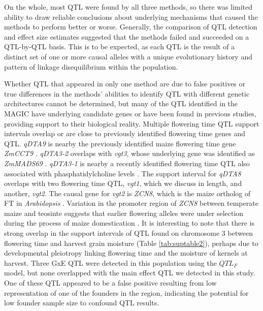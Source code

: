 \documentclass[9pt,twocolumn,twoside]{gsag3jnl}
\begin{document}
On the whole, most QTL were found by all three methods, so there was limited ability to draw reliable conclusions about underlying mechanisms that caused the methods to perform better or worse.
Generally, the comparison of QTL detection and effect size estimates suggested that the methods failed and succeeded on a QTL-by-QTL basis.
This is to be expected, as each QTL is the result of a distinct set of one or more causal alleles with a unique evolutionary history and pattern of linkage disequilibrium within the population.

Whether QTL that appeared in only one method are due to false positives or true differences in the methods' abilities to identify QTL with different genetic architectures cannot be determined, but many of the QTL identified in the MAGIC have underlying candidate genes or have been found in previous studies, providing support to their biological reality.
Multiple flowering time QTL support intervals overlap or are close to previously identified flowering time genes and QTL.
\emph{qDTA9} is nearby the previously identified maize flowering time gene \emph{ZmCCT9} \citep{Huang3}.
\emph{qDTA3-2} overlaps with \emph{vgt3}, whose underlying gene was identified as \emph{ZmMADS69} \citep{Liang}.
\emph{qDTA3-1} is nearby a recently identified flowering time QTL also associated with phasphatidylcholine levels \citep{RodriguezZapata}.
The support interval for \emph{qDTA8} overlaps with two flowering time QTL, \emph{vgt1}, which we discuss in length, and another, \emph{vgt2}.
The causal gene for \emph{vgt2} is \emph{ZCN8}, which is the maize ortholog of FT in \emph{Arabidopsis} \citep{Lazakis}.
Variation in the promoter region of \emph{ZCN8} between temperate maize and teosinte suggests that earlier flowering alleles were under selection during the process of maize domestication \citep{Guo,Bouchet}.
It is interesting to note that there is strong overlap in the support intervals of QTL found on chromosome 3 between flowering time and harvest grain moisture (Table \ref{tab:suptable2}), perhaps due to developmental pleiotropy linking flowering time and the moisture of kernels at harvest.
Three GxE QTL were detected in this population \citep{Hudson_in_prep} using the $QTL_F$ model, but none overlapped with the main effect QTL we detected in this study.
One of these QTL appeared to be a false positive resulting from low representation of one of the founders in the region, indicating the potential for low founder sample size to confound QTL results.
\end{document}
